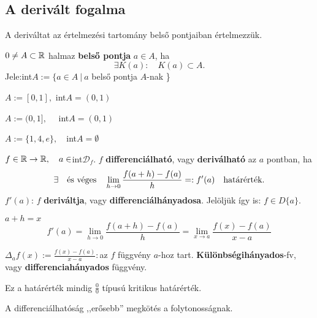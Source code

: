 \documentclass[a4paper,11.5pt]{article}
\begin{document}
	\subsection{A derivált fogalma}
	\begin{note}
		A deriváltat az értelmezési tartomány belső pontjaiban értelmezzük.
	\end{note}
	\begin{definition}
		$0\not=A\subset \mathbb{R}$ halmaz \textbf{belső pontja} $a\in A$, ha
		\[  \exists K(a):\quad K(a)\subset A. \]
		Jele:\quad int$ A:=\{ a\in A\ | \ a $ belső pontja $A$-nak \}
	\end{definition}
	\begin{example}
		$A:=[0,1],$ \quad int$A=(0,1)$
	\end{example}
	\begin{example}
		$A:=(0,1],\quad $ int$A=(0,1)$
	\end{example}
	\begin{example}
		$A:=\{1,4,e\},\quad $int$A=\emptyset$
	\end{example}
	\begin{definition}
		$f\in\mathbb{R}\to\mathbb{R}, \quad a\in$int$\mathcal{D}_f$. $f$ \textbf{differenciálható}, vagy \textbf{deriválható} az $a$ pontban, ha
		\[ \exists\text{\quad és véges\quad }\lim_{h\to0}\frac{f(a+h)-f(a)}{h}=:f'(a)\quad \text{határérték.} \]
		$f'(a)$: $f$ \textbf{deriváltja}, vagy \textbf{differenciálhányadosa}.
		Jelöljük így is: $f\in D\{a\}$.
	\end{definition}
	\begin{note}
		$a+h=x$
		\[ f'(a)=\lim_{h\to0}\frac{f(a+h)-f(a)}{h}=\lim_{x\to a}\frac{f(x)-f(a)}{x-a} \]
	\end{note}
	\begin{note}
		 $ \varDelta_af(x):=\frac{f(x)-f(a)}{x-a}:$\quad az $f$ függvény $a$-hoz tart. \textbf{Különbségihányados}-fv, vagy \textbf{differenciahányados} függvény.
	\end{note}
	\begin{note}
		Ez a határérték mindig $\frac{0}{0}$ típusú kritikus határérték.
	\end{note}
	\begin{note}
		A differenciálhatóság ,,erősebb'' megkötés a folytonosságnak.
	\end{note}
\end{document}

